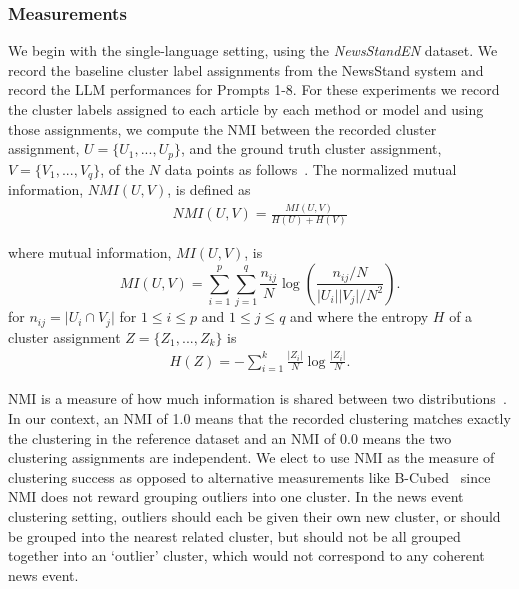 \subsubsection{Measurements}
We begin with the single-language setting, using the \emph{NewsStandEN} dataset.
We record the baseline cluster label assignments from the NewsStand system and record the LLM performances for Prompts 1-8.
For these experiments we record the cluster labels assigned to each article by each method or model and using those assignments, we compute the \ac{NMI} between the recorded cluster assignment, $U = \{U_1, ..., U_p\}$, and the ground truth cluster assignment, $V = \{V_1, ..., V_q\}$, of the $N$ data points as follows~\cite{vinh10a}.
%
The normalized mutual information, $NMI(U,V)$, is defined as
\begin{equation}\label{eq:rwd-func}
\begin{split}
    NMI(U, V) = \frac{MI(U, V)}{H(U) + H(V)}
\end{split}
\end{equation}

\noindent where mutual information, $MI(U,V)$, is
\begin{equation}
    MI(U, V) = \sum\limits_{i=1}^p\sum\limits_{j=1}^q \frac{n_{ij}}{N}\log\left(\frac{n_{ij}/N}{\lvert U_i \rvert \lvert V_j \rvert / N^2}\right).
\end{equation}
\noindent for $n_{ij} = \lvert U_i \cap V_j \rvert$ for $1 \leq i \leq p$ and $1 \leq j \leq q$ and where the entropy $H$ of a cluster assignment $Z = \{Z_1, ..., Z_k\}$ is
\begin{equation}
    \begin{split}
        H(Z) = -\sum\limits_{i=1}^{k} \frac{\lvert Z_i \rvert}{N}\log \frac{\lvert Z_i \rvert}{N}.
    \end{split}
\end{equation}


\ac{NMI} is a measure of how much information is shared between two distributions~\cite{Strehl2002}. 
In our context, an \ac{NMI} of 1.0 means that the recorded clustering matches exactly the clustering in the reference dataset and an \ac{NMI} of 0.0 means the two clustering assignments are independent. 
%
We elect to use \ac{NMI} as the measure of clustering success as opposed to alternative measurements like B-Cubed~\cite{bagga1998entity} since \ac{NMI} does not reward grouping outliers into one cluster.
In the news event clustering setting, outliers should each be given their own new cluster, or should be grouped into the nearest related cluster, but should not be all grouped together into an `outlier' cluster, which would not correspond to any coherent news event.

